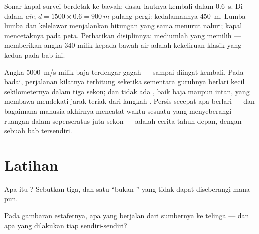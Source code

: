 \begin{example}\label{ex:g7:sound-production:sonar}
Sonar kapal survei berdetak ke bawah;  dasar lautnya kembali dalam
\qty{0.6}{s}. Di dalam \emph{air}, $d = 1500 \times 0.6 =
\qty{900}{m}$ pulang pergi: kedalamannya \qty{450}{m}. Lumba-lumba dan
kelelawar menjalankan hitungan yang sama menurut naluri; kapal
mencetaknya pada peta. Perhatikan disiplinnya: mediumlah yang memilih
 --- memberikan angka $340$ milik  kepada  bawah
air adalah kekeliruan klasik yang kedua pada bab ini.
\end{example}

\begin{remark}\label{rem:g7:sound-production:light}
Angka \qty{5000}{m/s} milik baja terdengar gagah --- sampai 
diingat kembali. Pada badai, perjalanan kilatnya terhitung seketika
sementara guruhnya berlari kecil sekilometernya dalam tiga sekon; dan
tidak ada , baik baja maupun intan, yang membawa  mendekati
jarak teriak dari langkah . Persis secepat apa  berlari
--- dan bagaimana manusia akhirnya mencatat waktu sesuatu yang
menyeberangi ruangan dalam seperseratus juta sekon --- adalah cerita
tahun depan, dengan sebuah bab tersendiri.
\end{remark}

\section{Latihan}

\begin{exercise}[$\star$]\label{exo:g7:sound-production:1}
Apa itu ? Sebutkan tiga, dan satu ``bukan '' yang tidak
dapat diseberangi  mana pun.
\end{exercise}

\begin{exercise}[$\star$]\label{exo:g7:sound-production:2}
Pada gambaran estafetnya, apa yang berjalan dari sumbernya ke telinga
--- dan apa yang dilakukan tiap  sendiri-sendiri?
\end{exercise}

